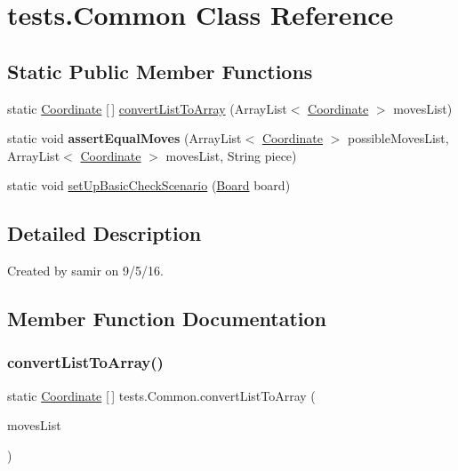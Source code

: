 \hypertarget{classtests_1_1_common}{}\section{tests.\+Common Class Reference}
\label{classtests_1_1_common}
\subsection*{Static Public Member Functions}
\begin{DoxyCompactItemize}
\item 
static \hyperlink{classmain_1_1model_1_1_coordinate}{Coordinate} \mbox{[}$\,$\mbox{]} \hyperlink{classtests_1_1_common_ae3ef6e3a6b2c768109148390741fe5ab}{convert\+List\+To\+Array} (Array\+List$<$ \hyperlink{classmain_1_1model_1_1_coordinate}{Coordinate} $>$ moves\+List)
\item 
\hypertarget{classtests_1_1_common_a744e8daa6dcdc7c7bd38b3cd7719b22e}{}\label{classtests_1_1_common_a744e8daa6dcdc7c7bd38b3cd7719b22e} 
static void {\bfseries assert\+Equal\+Moves} (Array\+List$<$ \hyperlink{classmain_1_1model_1_1_coordinate}{Coordinate} $>$ possible\+Moves\+List, Array\+List$<$ \hyperlink{classmain_1_1model_1_1_coordinate}{Coordinate} $>$ moves\+List, String piece)
\item 
static void \hyperlink{classtests_1_1_common_a935d4c1745869db3bce70b6b17044d58}{set\+Up\+Basic\+Check\+Scenario} (\hyperlink{classmain_1_1model_1_1_board}{Board} board)
\end{DoxyCompactItemize}


\subsection{Detailed Description}
Created by samir on 9/5/16. 

\subsection{Member Function Documentation}
\hypertarget{classtests_1_1_common_ae3ef6e3a6b2c768109148390741fe5ab}{}\label{classtests_1_1_common_ae3ef6e3a6b2c768109148390741fe5ab} 
\subsubsection{\texorpdfstring{convert\+List\+To\+Array()}{convertListToArray()}}
{\footnotesize\ttfamily static \hyperlink{classmain_1_1model_1_1_coordinate}{Coordinate} \mbox{[}$\,$\mbox{]} tests.\+Common.\+convert\+List\+To\+Array (\begin{DoxyParamCaption}\item[{Array\+List$<$ \hyperlink{classmain_1_1model_1_1_coordinate}{Coordinate} $>$}]{moves\+List }\end{DoxyParamCaption})\hspace{0.3cm}{\ttfamily [static]}}

